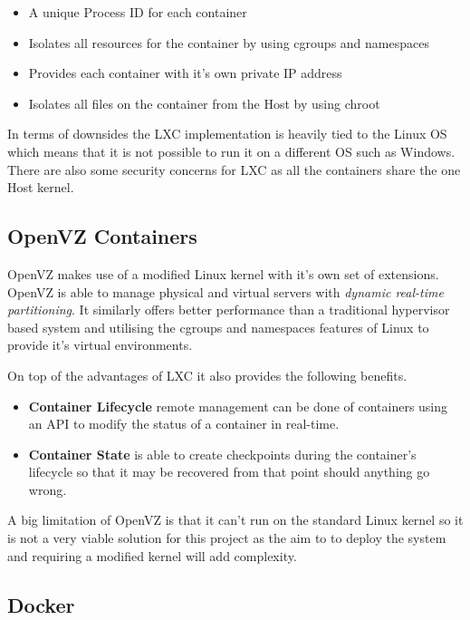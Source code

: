 \begin{itemize}
    \item A unique Process ID for each container
    \item Isolates all resources for the container by using cgroups and namespaces
    \item Provides each container with it's own private IP address
    \item Isolates all files on the container from the Host by using chroot
\end{itemize}

In terms of downsides the LXC implementation is heavily tied to the Linux OS which means that it is not possible to run it on a different OS such as Windows. There are also some security concerns for LXC as all the containers share the one Host kernel.

\subsection{OpenVZ Containers}

OpenVZ makes use of a modified Linux kernel with it's own set of extensions. OpenVZ is able to manage physical and virtual servers with \textit{dynamic real-time partitioning}. It similarly offers better performance than a traditional hypervisor based system and utilising the cgroups and namespaces features of Linux to provide it's virtual environments.

On top of the advantages of LXC it also provides the following benefits.

\begin{itemize}
    \item \textbf{Container Lifecycle} remote management can be done of containers using an API to modify the status of a container in real-time. 
    \item \textbf{Container State} is able to create checkpoints during the container's lifecycle so that it may be recovered from that point should anything go wrong.
\end{itemize}

A big limitation of OpenVZ is that it can't run on the standard Linux kernel so it is not a very viable solution for this project as the aim to to deploy the system and requiring a modified kernel will add complexity.

\subsection{Docker}

